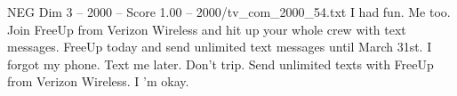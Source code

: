 \begin{textsample}{NEG Dim 3 – 2000 – Score 1.00 – 2000/tv\_com\_2000\_54.txt}  \label{ex:f3_neg_018}
I had fun.
Me too.
Join FreeUp from Verizon Wireless and hit up your whole crew with text messages.
FreeUp today and send unlimited text messages until March 31st.
I forgot my phone.
Text me later.
Don't trip.
Send unlimited texts with FreeUp from Verizon Wireless.
I 'm okay.

\end{textsample}
